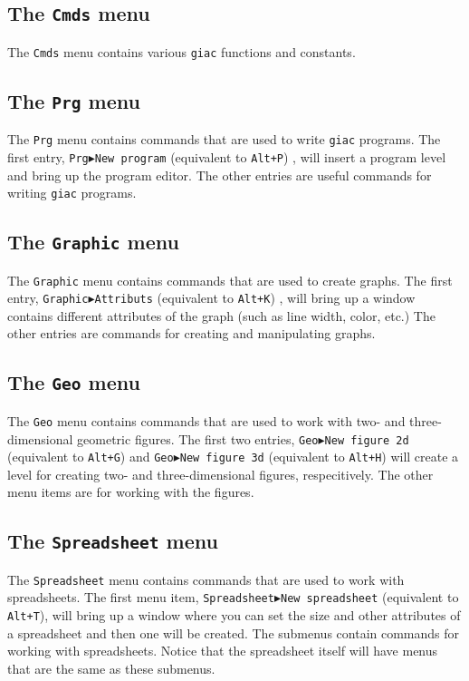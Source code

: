 \documentclass[a4paper,11pt]{book}
\begin{document}
\subsection{The \texttt{Cmds} menu}

The \texttt{Cmds} menu contains various \texttt{giac} functions and
constants.

\subsection{The \texttt{Prg} menu}

The \texttt{Prg} menu contains commands that are used to write
\texttt{giac} programs.  The first entry,
\texttt{Prg$\blacktriangleright$New program} (equivalent to
\texttt{Alt+P}) , will insert a program level and bring up the program
editor.  The other entries are useful commands for writing
\texttt{giac} programs. 

\subsection{The \texttt{Graphic} menu}

The \texttt{Graphic} menu contains commands that are used to create
graphs.  The first entry,
\texttt{Graphic$\blacktriangleright$Attributs} (equivalent
to \texttt{Alt+K}) , will bring up a window
contains different attributes of the graph (such as line width, color,
etc.)  The other entries are commands for creating and manipulating
graphs.

\subsection{The \texttt{Geo} menu}

The \texttt{Geo} menu contains commands that are used to work with
two- and three-dimensional geometric figures.  The first two entries,
\texttt{Geo$\blacktriangleright$New figure 2d} (equivalent to
\texttt{Alt+G}) and \texttt{Geo$\blacktriangleright$New figure 3d} 
(equivalent to \texttt{Alt+H}) 
will create a level for
creating two- and three-dimensional figures, respecitively.  The other
menu items are for working with the figures.

\subsection{The \texttt{Spreadsheet} menu}

The \texttt{Spreadsheet} menu contains commands that are used to work with
spreadsheets.  The first menu item, 
\texttt{Spreadsheet$\blacktriangleright$New spreadsheet}
(equivalent to \texttt{Alt+T}), will bring
up a window where you can set the size and other attributes of a
spreadsheet and then one will be created.  The submenus
contain commands for working with spreadsheets.  Notice that the
spreadsheet itself will have menus that are the same as these submenus.
\end{document}
